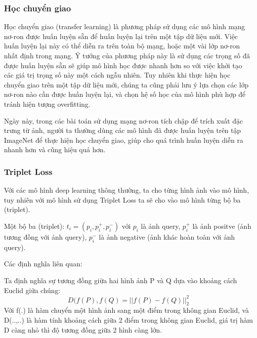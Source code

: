 \documentclass[a4paper,14pt]{extreport}
\begin{document}
\subsubsection*{ Học chuyển giao }
Học chuyển giao (transfer learning) là phương pháp sử dụng các mô hình mạng nơ-ron được huấn luyện 
sẵn để huấn luyện lại trên một tập dữ liệu mới. Việc huấn luyện lại này có thể diễn ra trên toàn bộ mạng, 
hoặc một vài lớp nơ-ron nhất định trong mạng. Ý tưởng của phương pháp này là sử dụng các trọng số đã được 
huấn luyện sẵn sẽ giúp mô hình học được nhanh hơn so với việc khởi tạo các giá trị trọng số này một cách
 ngẫu nhiên. Tuy nhiên khi thực hiện học chuyển giao trên một tập dữ liệu mới, chúng ta cũng phải lưu ý 
 lựa chọn các lớp nơ-ron nào cần được huấn luyện lại, và chọn hệ số học của mô hình phù hợp để tránh hiện 
 tượng overfitting.
\par 
Ngày này, trong các bài toán sử dụng mạng nơ-ron tích chập để trích xuất đặc trưng từ ảnh, người ta 
thường dùng các mô hình đã được huấn luyện trên tập ImageNet để thực hiện học chuyển giao, giúp cho quá 
trình huấn luyện diễn ra nhanh hơn và cũng hiệu quả hơn.

\subsubsection*{ Triplet Loss }

Với các mô hình deep learning thông thường, ta cho từng hình ảnh vào mô hình, tuy nhiên với mô hình sử dụng Triplet Loss ta sẽ cho vào mô hình từng bộ ba (triplet).

Một bộ ba (triplet): $t_i = (p_i,p_i^{+},p_i^{-})$ với $p_i$ là ảnh query, $p_i^{+}$ là ảnh positve (ảnh tương đồng với ảnh query), $p_i^{-}$ là ảnh negative (ảnh khác hoàn toàn với ảnh query).

Các định nghĩa liên quan:

Ta định nghĩa sự tương đồng giữa hai hình ảnh P và Q dựa vào khoảng cách Euclid giữa chúng:
\[ D(f(P),f(Q) = {||f(P) - f(Q)||}_2^2\]
Với f(.) là hàm chuyển một hình ảnh sang một điểm trong không gian Euclid, và D(..,..) là hàm tính khoảng cách giữa 2 điểm trong không gian Euclid, giá trị hàm D càng nhỏ thì độ tương đồng giữa 2 hình càng lớn.
\end{document}
